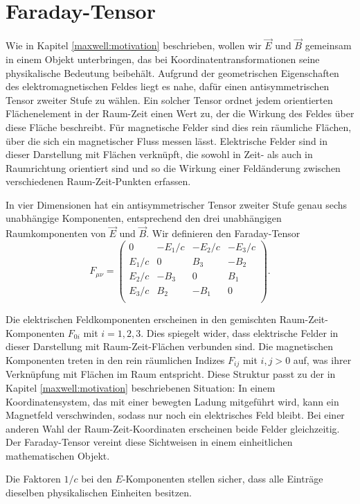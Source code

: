 \section{Faraday-Tensor}
\label{maxwell:faraday}
Wie in Kapitel \ref{maxwell:motivation} beschrieben, wollen wir $\vec{E}$ und $\vec{B}$ gemeinsam in einem Objekt unterbringen, das bei Koordinatentransformationen seine physikalische Bedeutung beibehält. Aufgrund der geometrischen Eigenschaften des elektromagnetischen Feldes liegt es nahe, dafür einen antisymmetrischen Tensor zweiter Stufe zu wählen. Ein solcher Tensor ordnet jedem orientierten Flächenelement in der Raum-Zeit einen Wert zu, der die Wirkung des Feldes über diese Fläche beschreibt. Für magnetische Felder sind dies rein räumliche Flächen, über die sich ein magnetischer Fluss messen lässt. Elektrische Felder sind in dieser Darstellung mit Flächen verknüpft, die sowohl in Zeit- als auch in Raumrichtung orientiert sind und so die Wirkung einer Feldänderung zwischen verschiedenen Raum-Zeit-Punkten erfassen.

In vier Dimensionen hat ein antisymmetrischer Tensor zweiter Stufe genau sechs unabhängige Komponenten, entsprechend den drei unabhängigen Raumkomponenten von $\vec{E}$ und $\vec{B}$. Wir definieren den Faraday-Tensor
\[
F_{\mu\nu}
= 
\begin{pmatrix}
	0 & -E_1/c & -E_2/c & -E_3/c \\
	E_1/c &  0 &  B_3 & -B_2 \\
	E_2/c & -B_3 &  0 &  B_1 \\
	E_3/c &  B_2 & -B_1 &  0 \\
\end{pmatrix}.
\]

Die elektrischen Feldkomponenten erscheinen in den gemischten Raum-Zeit-Komponenten $F_{0i}$ mit $i=1,2,3$. Dies spiegelt wider, dass elektrische Felder in dieser Darstellung mit Raum-Zeit-Flächen verbunden sind. Die magnetischen Komponenten treten in den rein räumlichen Indizes $F_{ij}$ mit $i,j>0$ auf, was ihrer Verknüpfung mit Flächen im Raum entspricht. Diese Struktur passt zu der in Kapitel \ref{maxwell:motivation} beschriebenen Situation: In einem Koordinatensystem, das mit einer bewegten Ladung mitgeführt wird, kann ein Magnetfeld verschwinden, sodass nur noch ein elektrisches Feld bleibt. Bei einer anderen Wahl der Raum-Zeit-Koordinaten erscheinen beide Felder gleichzeitig. Der Faraday-Tensor vereint diese Sichtweisen in einem einheitlichen mathematischen Objekt.

Die Faktoren $1/c$ bei den $E$-Komponenten stellen sicher, dass alle Einträge dieselben physikalischen Einheiten besitzen.





